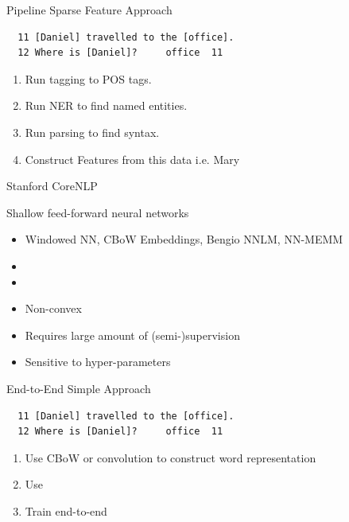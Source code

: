\documentclass{beamer}
\begin{document}
\begin{frame}{Pipeline Sparse Feature Approach}

\begin{verbatim}
  11 [Daniel] travelled to the [office].
  12 Where is [Daniel]?     office  11
\end{verbatim}

  \begin{enumerate}
  \item Run tagging to POS tags.
  \item Run NER to find named entities.
  \item Run parsing to find syntax.
  \item Construct Features from this data i.e. 
    Mary  
    
  \end{enumerate}

\end{frame}

\begin{frame}{Stanford CoreNLP}
  
\end{frame}


\begin{frame}
  Shallow feed-forward neural networks
  \air 

  \begin{itemize}
  \item Windowed NN, CBoW Embeddings, Bengio NNLM, NN-MEMM
  \end{itemize}
  \paurse

  \begin{itemize}
  \item {}
  \item {}
  \item \alert{Non-convex}
  \item \alert{Requires large amount of (semi-)supervision}
  \item \alert{Sensitive to hyper-parameters}
  \end{itemize}
\end{frame}

\begin{frame}{End-to-End Simple Approach}

\begin{verbatim}
  11 [Daniel] travelled to the [office].
  12 Where is [Daniel]?     office  11
\end{verbatim}

  \begin{enumerate}
  \item Use CBoW or convolution to construct word representation 
  \item Use  
  \item Train end-to-end
  \end{enumerate}

\end{frame}
\end{document}
